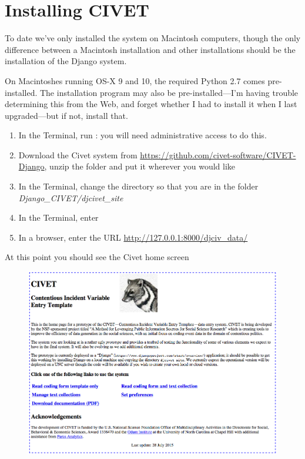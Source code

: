 \documentclass[letterpaper,10pt,english]{sphinxmanual}
\begin{document}
\chapter{Installing CIVET}
\label{installing:installing-civet}\label{installing::doc}
To date we’ve only installed the system on Macintosh computers, though
the only difference between a Macintosh installation and other
installations should be the installation of the Django system.

On Macintoshes running OS-X 9 and 10, the required Python 2.7 comes
pre-installed. The  installation program may also be
pre-installed—I’m having trouble determining this from the Web, and
forget whether I had to install it when I last upgraded—but if not,
install that.
\begin{enumerate}
\item {} 
In the Terminal, run : you will need
administrative access to do this.

\item {} 
Download the Civet system from
\href{https://github.com/civet-software/CIVET-Django}{https://github.com/civet-software/CIVET-Django}, unzip the folder and
put it wherever you would like

\item {} 
In the Terminal, change the directory so that you are in the folder
\emph{Django\_CIVET/djcivet\_site}

\item {} 
In the Terminal, enter 

\item {} 
In a browser, enter the URL \href{http://127.0.0.1:8000/djciv\_data/}{http://127.0.0.1:8000/djciv\_data/}

\end{enumerate}

At this point you should see the Civet home screen
\begin{figure}[htbp]
\centering

\includegraphics[width=1.000\linewidth]{civethome.png}
\end{figure}
\end{document}

